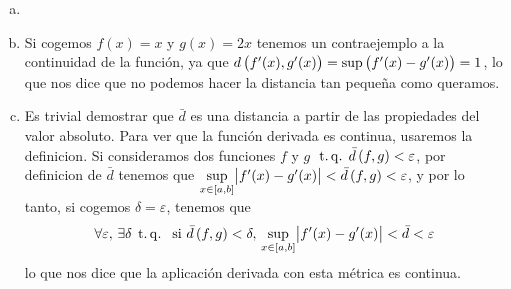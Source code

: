 \begin{eje}
  \begin{enumerate}[(a)]
   \item []
   \item Si cogemos $f(x)=x$ y $g(x)=2x$ tenemos un contraejemplo a la continuidad de la función, ya que $d\left( f'(x), g'(x) \right) = \sup \left( f'(x)-g'(x)\right) = 1$, lo que nos dice que no podemos hacer la distancia tan pequeña como queramos.
   \item Es trivial demostrar que $\bar{d}$ es una distancia a partir de las propiedades del valor absoluto.  Para ver que la función derivada es continua, usaremos la definicion.
   Si consideramos dos funciones $f$ y $g$ $\operatorname{\;t.q.\;} \bar{d}\left( f,g\right) < \varepsilon$, por definicion de $\bar{d}$ tenemos que $\sup\limits_{x \in [a,b]} \abs{f'(x)-g'(x)}<\bar{d}\left( f,g\right)<\varepsilon$, y por lo tanto, si cogemos $\delta = \varepsilon$, tenemos que
   \[
    \forall \varepsilon,\, \exists \delta \operatorname{\;t.q.\;} \text{ si } \bar{d}\left( f,g \right) < \delta,\, \sup_{x \in [a,b]} \abs{f'(x)-g'(x)}<\bar{d}<\varepsilon
   \]
    lo que nos dice que la aplicación derivada con esta métrica es continua.
  \end{enumerate}
\end{eje}
